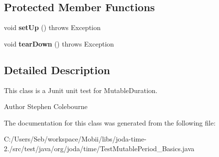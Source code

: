 \subsection*{Protected Member Functions}
\begin{DoxyCompactItemize}
\item 
\hypertarget{classorg_1_1joda_1_1time_1_1_test_mutable_period___basics_aefeca5df13d133b076e3955d65099b10}{void {\bfseries set\-Up} ()  throws Exception }\label{classorg_1_1joda_1_1time_1_1_test_mutable_period___basics_aefeca5df13d133b076e3955d65099b10}

\item 
\hypertarget{classorg_1_1joda_1_1time_1_1_test_mutable_period___basics_a05ba674c2ede2af721061e0c57c6df79}{void {\bfseries tear\-Down} ()  throws Exception }\label{classorg_1_1joda_1_1time_1_1_test_mutable_period___basics_a05ba674c2ede2af721061e0c57c6df79}

\end{DoxyCompactItemize}


\subsection{Detailed Description}
This class is a Junit unit test for Mutable\-Duration.

\begin{DoxyAuthor}{Author}
Stephen Colebourne 
\end{DoxyAuthor}


The documentation for this class was generated from the following file\-:\begin{DoxyCompactItemize}
\item 
C\-:/\-Users/\-Seb/workspace/\-Mobii/libs/joda-\/time-\/2./src/test/java/org/joda/time/Test\-Mutable\-Period\-\_\-\-Basics.\-java\end{DoxyCompactItemize}

